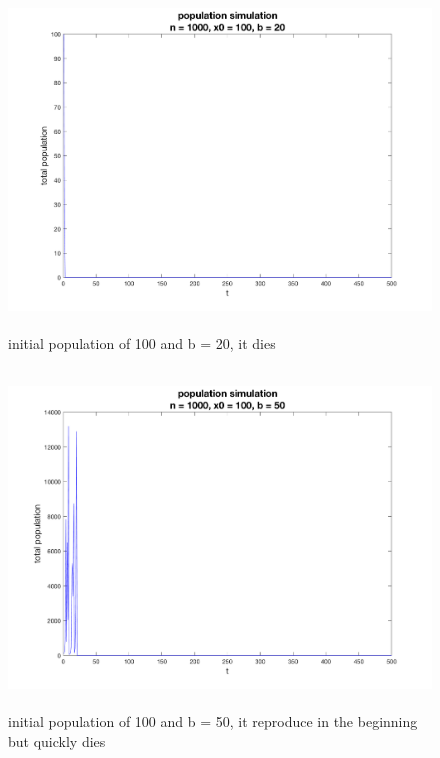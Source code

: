 \documentclass[12pt]{article}
\begin{document}
\begin{figure}[H] %
\centering
\includegraphics[width = 12 cm, height = 9cm]{single_run n1000 x0100 b20.png}
\caption{initial population of 100 and b = 20, it dies}
\label{fig:p1s4}
\end{figure}

\begin{figure}[H] %
\centering
\includegraphics[width = 12 cm, height = 9cm]{single_run n1000 x0100 b50.png}
\caption{initial population of 100 and b = 50, it reproduce in the beginning but quickly dies}
\label{fig:p1s5}
\end{figure}
\end{document}
